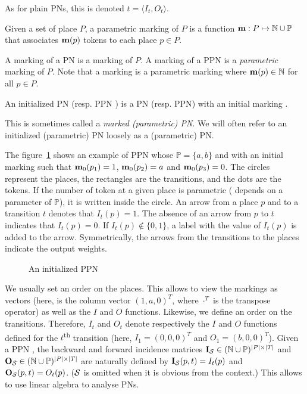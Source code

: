 As for plain \acp{PN}, this is denoted $t = \langle I_t, O_t \rangle$.

\begin{defi}
  Given a set of place $P$, a parametric marking of $P$ is a function $\mathbf{m} : P \mapsto \mathbb{N} \cup \mathbb{P} $ that associates $\mathbf{m}(p)$ tokens to each place $p \in P$.
\end{defi}

A marking of a \ac{PN} \NPT is a marking of $P$.
A marking of a \ac{PPN} \SPTP is a \emph{parametric} marking of $P$.
Note that a marking \marq is a parametric marking where $\mathbf{m}(p) \in \mathbb{N}$ for all $p \in P$.

\begin{defi}
  An initialized \ac{PN} \NPTm (resp. \ac{PPN} \SPTPm) is a \ac{PN} (resp. \ac{PPN}) with an initial marking \marqi.
\end{defi}

This is sometimes called a \emph{marked (parametric) \ac{PN}}.
We will often refer to an initialized (parametric) \ac{PN} loosely as a (parametric) \ac{PN}.

The figure~\ref{fig:parametric-petri-net-example} shows an example of \ac{PPN} whose $\mathbb{P} = \{a, b\}$ and with an initial marking \marqi such that $\mathbf{m}_0(p_1) = 1$, $\mathbf{m}_0(p_2) = a$ and $\mathbf{m}_0(p_3) = 0$. The circles represent the places, the rectangles are the transitions, and the dots are the tokens. If the number of token at a given place is parametric ( depends on a parameter of $\mathbb{P}$), it is written inside the circle. An arrow from a place $p$ and to a transition $t$ denotes that $I_t(p) = 1$. The absence of an arrow from $p$ to $t$ indicates that $I_t(p) = 0$. If $I_t(p) \notin \{0, 1\}$, a label with the value of $I_t(p)$ is added to the arrow.
Symmetrically, the arrows from the transitions to the places indicate the output weights.

\begin{figure}[h]
  \centering
  
  \par
  \caption{An initialized \ac{PPN}}
  \label{fig:parametric-petri-net-example}
\end{figure}

We usually set an order on the places.
This allows to view the markings as vectors (here, \marqi is the column vector $(1, a, 0)^T$, where $\cdot^T$ is the transpose operator) as well as the $I$ and $O$ functions.
Likewise, we define an order on the transitions.
Therefore, $I_t$ and $O_t$ denote respectively the $I$ and $O$ functions defined for the $t$\textsuperscript{th} transition (here, $I_1 = (0, 0, 0)^T$ and $O_1 = (b, 0, 0)^T$).
Given a \ac{PPN} \SPTP, the backward and forward incidence matrices $\mathbf{I}_\mathcal{S} \in (\mathbb{N} \cup \mathbb{P})^{|P|\times|T|}$ and $\mathbf{O}_\mathcal{S} \in (\mathbb{N} \cup \mathbb{P})^{|P|\times|T|}$ are naturally defined by $\mathbf{I}_\mathcal{S}(p, t) = I_t(p)$ and $\mathbf{O}_\mathcal{S}(p, t) = O_t(p)$.
($\mathcal{S}$ is omitted when it is obvious from the context.)
This allows to use linear algebra to analyse \acp{PN}.

